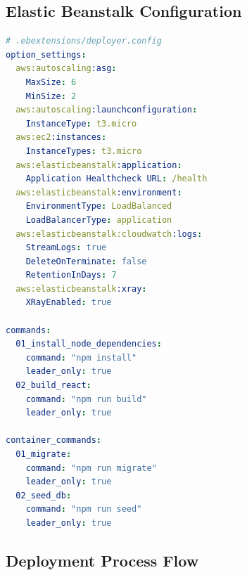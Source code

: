 \subsection{Elastic Beanstalk Configuration}

\begin{lstlisting}[language=yaml, caption=AWS Elastic Beanstalk Configuration, captionpos=b]
# .ebextensions/deployer.config
option_settings:
  aws:autoscaling:asg:
    MaxSize: 6
    MinSize: 2
  aws:autoscaling:launchconfiguration:
    InstanceType: t3.micro
  aws:ec2:instances:
    InstanceTypes: t3.micro
  aws:elasticbeanstalk:application:
    Application Healthcheck URL: /health
  aws:elasticbeanstalk:environment:
    EnvironmentType: LoadBalanced
    LoadBalancerType: application
  aws:elasticbeanstalk:cloudwatch:logs:
    StreamLogs: true
    DeleteOnTerminate: false
    RetentionInDays: 7
  aws:elasticbeanstalk:xray:
    XRayEnabled: true

commands:
  01_install_node_dependencies:
    command: "npm install"
    leader_only: true
  02_build_react:
    command: "npm run build"
    leader_only: true

container_commands:
  01_migrate:
    command: "npm run migrate"
    leader_only: true
  02_seed_db:
    command: "npm run seed"
    leader_only: true
\end{lstlisting}

\subsection{Deployment Process Flow}

